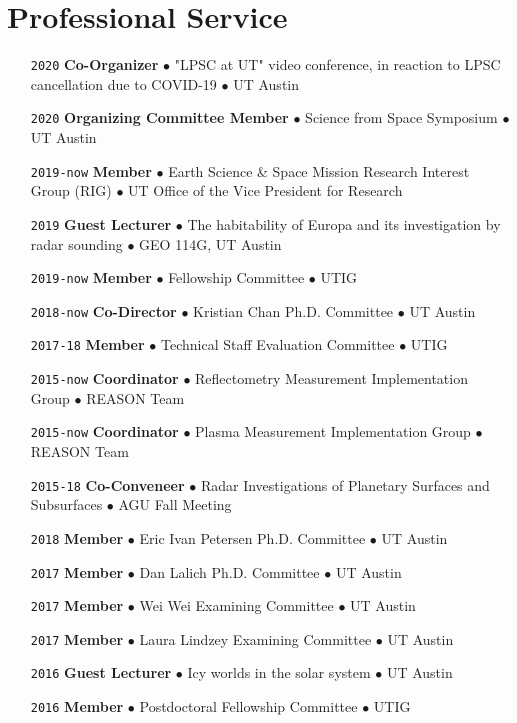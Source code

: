 \section*{Professional Service}

\begin{itemize}[leftmargin=5.8em, labelsep=1.5em]
    \setlength\itemsep{-.5em}
    \item[\texttt{2020}] \textbf{Co-Organizer} $\bullet$ "LPSC at UT" video conference, in reaction to LPSC cancellation due to COVID-19 $\bullet$ UT Austin
    \item[\texttt{2020}] \textbf{Organizing Committee Member} $\bullet$ Science from Space Symposium $\bullet$ UT Austin
    \item[\texttt{2019-now}] \textbf{Member} $\bullet$ Earth Science \& Space Mission Research Interest Group (RIG) $\bullet$ UT Office of the Vice President for Research
    \item[\texttt{2019}] \textbf{Guest Lecturer} $\bullet$ The habitability of Europa and its investigation by radar sounding $\bullet$  GEO 114G, UT Austin
    \item[\texttt{2019-now}] \textbf{Member} $\bullet$ Fellowship Committee $\bullet$ UTIG
    \item[\texttt{2018-now}] \textbf{Co-Director} $\bullet$ Kristian Chan Ph.D. Committee $\bullet$ UT Austin
    \item[\texttt{2017-18}] \textbf{Member} $\bullet$ Technical Staff Evaluation Committee $\bullet$ UTIG
    \item[\texttt{2015-now}] \textbf{Coordinator} $\bullet$ Reflectometry Measurement Implementation Group $\bullet$ REASON Team
    \item[\texttt{2015-now}] \textbf{Coordinator} $\bullet$ Plasma Measurement Implementation Group $\bullet$ REASON Team
    \item[\texttt{2015-18}] \textbf{Co-Conveneer} $\bullet$  Radar Investigations of Planetary Surfaces and Subsurfaces $\bullet$ AGU Fall Meeting
    \item[\texttt{2018}] \textbf{Member} $\bullet$ Eric Ivan Petersen Ph.D. Committee $\bullet$ UT Austin
    \item[\texttt{2017}] \textbf{Member} $\bullet$ Dan Lalich Ph.D. Committee $\bullet$ UT Austin
    \item[\texttt{2017}] \textbf{Member} $\bullet$ Wei Wei Examining Committee $\bullet$ UT Austin
    \item[\texttt{2017}] \textbf{Member} $\bullet$ Laura Lindzey Examining Committee $\bullet$ UT Austin
    \item[\texttt{2016}] \textbf{Guest Lecturer} $\bullet$ Icy worlds in the solar system $\bullet$ UT Austin
    \item[\texttt{2016}] \textbf{Member} $\bullet$ Postdoctoral Fellowship Committee $\bullet$ UTIG
\end{itemize}

